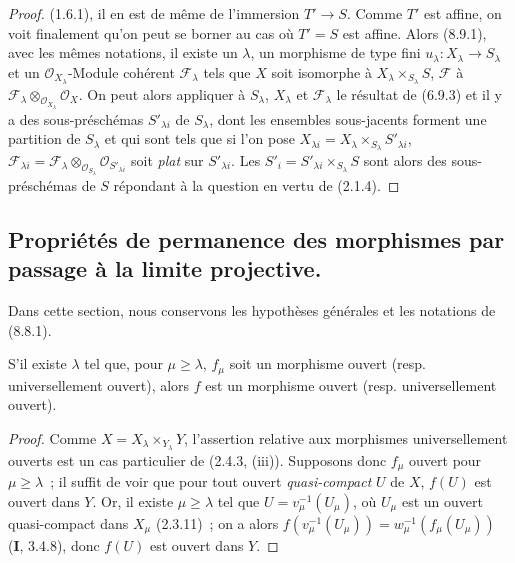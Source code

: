 \begin{proof}
(1.6.1), il en est de même de l'immersion $T'\to S$. Comme $T'$ est affine,
on voit finalement qu'on peut se borner au cas où $T'=S$ est affine.
Alors (8.9.1), avec les mêmes notations, il existe un $\lambda$, un morphisme
de type fini $u_\lambda:X_\lambda\to S_\lambda$ et un
$\mathcal O_{X_\lambda}$-Module cohérent $\mathcal F_\lambda$ tels que $X$
soit isomorphe à $X_\lambda\times_{S_\lambda}S$, $\mathcal F$ à
$\mathcal F_\lambda\otimes_{\mathcal O_{X_\lambda}}\mathcal O_X$. On peut
alors appliquer à $S_\lambda$, $X_\lambda$ et $\mathcal F_\lambda$ le
résultat de (6.9.3) et il y a des sous-préschémas $S'_{\lambda i}$ de
$S_\lambda$, dont les ensembles sous-jacents forment une partition de
$S_\lambda$ et qui sont tels que si l'on pose
$X_{\lambda i}=X_\lambda\times_{S_\lambda}S'_{\lambda i}$,
$\mathcal F_{\lambda i}=\mathcal F_\lambda\otimes_{\mathcal O_{S_\lambda}}
\mathcal O_{S'_{\lambda i}}$ soit \emph{plat} sur $S'_{\lambda i}$. Les
$S'_i=S'_{\lambda i}\times_{S_\lambda}S$ sont alors des sous-préschémas de
$S$ répondant à la question en vertu de (2.1.4).
\end{proof}

\subsection{Propriétés de permanence des morphismes par passage à la limite projective.}
\label{subsection:IV.8.10-fr}

Dans cette section, nous conservons les hypothèses générales et les notations
de (8.8.1).

\begin{proposition}[8.10.1]
S'il existe $\lambda$ tel que, pour $\mu\geq\lambda$, $f_\mu$ soit un morphisme
ouvert \textup{(resp.} universellement ouvert\textup{)}, alors $f$ est un morphisme ouvert
\textup{(resp.} universellement ouvert\textup{)}.
\end{proposition}

\begin{proof}
Comme $X=X_\lambda\times_{Y_\lambda}Y$, l'assertion relative aux morphismes
universellement ouverts est un cas particulier de (2.4.3, (iii)). Supposons
donc $f_\mu$ ouvert pour $\mu\geq\lambda$~; il suffit de voir que pour tout
ouvert \emph{quasi-compact} $U$ de $X$, $f(U)$ est ouvert dans $Y$. Or, il existe
$\mu\geq\lambda$ tel que $U=v_\mu^{-1}(U_\mu)$, où $U_\mu$ est un ouvert
quasi-compact dans $X_\mu$ (2.3.11)~; on a alors
$f(v_\mu^{-1}(U_\mu))=w_\mu^{-1}(f_\mu(U_\mu))$ (\textbf{I}, 3.4.8), donc $f(U)$ est
ouvert dans $Y$.
\end{proof}

